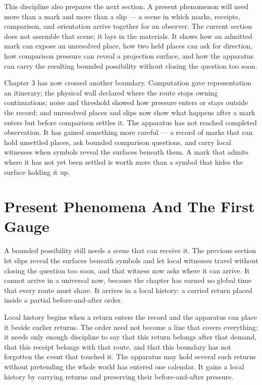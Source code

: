 This discipline also prepares the next section. A present phenomenon will need more than a mark and more than a slip --- a scene in which marks, receipts, comparison, and orientation arrive together for an observer. The current section does not assemble that scene; it lays in the materials. It shows how an admitted mark can expose an unresolved place, how two held places can ask for direction, how comparison pressure can reveal a projection surface, and how the apparatus can carry the resulting bounded possibility without closing the question too soon.

Chapter 3 has now crossed another boundary. Computation gave representation an itinerary; the physical wall declared where the route stops owning continuations; noise and threshold showed how pressure enters or stays outside the record; and unresolved places and slips now show what happens after a mark enters but before comparison settles it. The apparatus has not reached completed observation. It has gained something more careful --- a record of marks that can hold unsettled places, ask bounded comparison questions, and carry local witnesses when symbols reveal the surfaces beneath them. A mark that admits where it has not yet been settled is worth more than a symbol that hides the surface holding it up.

\section{Present Phenomena And The First Gauge}

A bounded possibility still needs a scene that can receive it. The previous section let slips reveal the surfaces beneath symbols and let local witnesses travel without closing the question too soon, and that witness now asks where it can arrive. It cannot arrive in a universal now, because the chapter has earned no global time that every route must share. It arrives in a local history: a carried return placed inside a partial before-and-after order.

Local history begins when a return enters the record and the apparatus can place it beside earlier returns. The order need not become a line that covers everything; it needs only enough discipline to say that this return belongs after that demand, that this receipt belongs with that route, and that this boundary has not forgotten the event that touched it. The apparatus may hold several such returns without pretending the whole world has entered one calendar. It gains a local history by carrying returns and preserving their before-and-after pressure.

